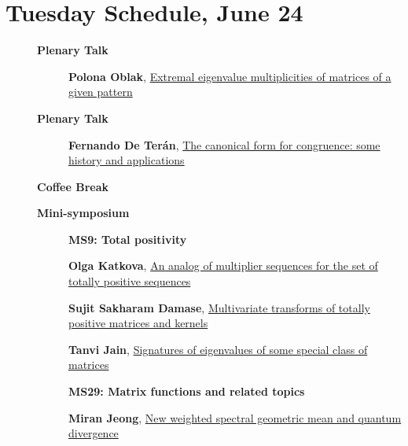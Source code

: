 \documentclass[ILAS2025-program.tex]{subfiles}
\begin{document}
\section{Tuesday Schedule, June 24}
    
    \begin{description}
    \item[] \textbf{Plenary Talk} 
    \begin{description}
        \item[] \hypertarget{up0002}{}\textbf{Polona Oblak}, \hyperlink{down0002}{Extremal eigenvalue multiplicities of matrices of a given pattern
}
        \end{description}
        \item[] \textbf{Plenary Talk} 
    \begin{description}
        \item[] \hypertarget{up0003}{}\textbf{Fernando De Terán}, \hyperlink{down0003}{The canonical form for congruence: some history and applications}
        \end{description}
        \item[] \textbf{Coffee Break} 
    \item[] \textbf{Mini-symposium} 
    \begin{description}
    \item[] {\color{mstitle}\textbf{MS9: Total positivity}} 
    \item[] \hypertarget{up0120}{}\textbf{Olga Katkova}, \hyperlink{down0120}{An analog of multiplier sequences for the set of totally positive sequences}
        \item[] \hypertarget{up0121}{}\textbf{Sujit Sakharam Damase}, \hyperlink{down0121}{Multivariate transforms of totally positive matrices and kernels
}
        \item[] \hypertarget{up0122}{}\textbf{Tanvi Jain}, \hyperlink{down0122}{Signatures of eigenvalues of some special class of matrices}
        \end{description}
    \begin{description}
    \item[] {\color{mstitle}\textbf{MS29: Matrix functions and related topics}} 
    \item[] \hypertarget{up0123}{}\textbf{Miran Jeong}, \hyperlink{down0123}{New weighted spectral geometric mean and quantum divergence}

\end{description}
\end{description}
\end{document}

